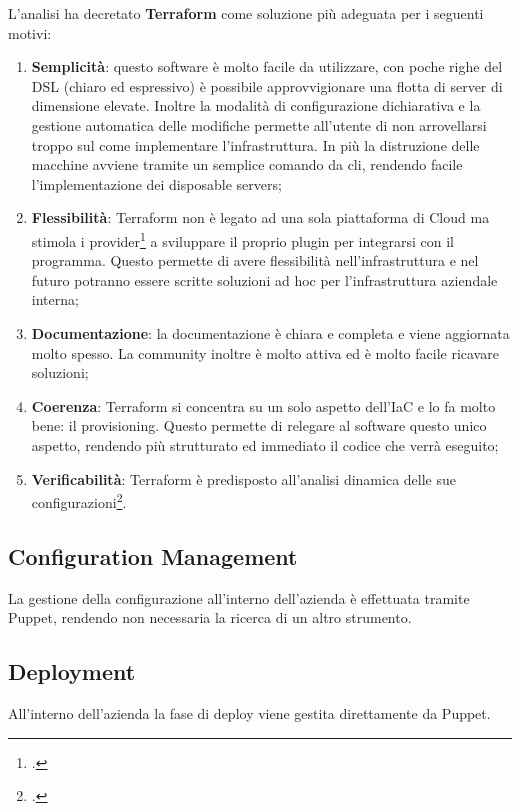 L'analisi ha decretato \textbf{Terraform} come soluzione più adeguata per i seguenti motivi:
\begin{enumerate}
	\item \textbf{Semplicità}: questo software è molto facile da utilizzare, con poche righe del DSL (chiaro ed espressivo) è possibile approvvigionare una flotta di server di dimensione elevate. Inoltre la modalità di configurazione dichiarativa e la gestione automatica delle modifiche permette all'utente di non arrovellarsi troppo sul come implementare l'infrastruttura. In più la distruzione delle macchine avviene tramite un semplice comando da \gls{cli}, rendendo facile l'implementazione dei disposable servers;
	\item \textbf{Flessibilità}: Terraform non è legato ad una sola piattaforma di Cloud ma stimola i provider\footcite{article:terraformextend} a sviluppare il proprio plugin per integrarsi con il programma. Questo permette di avere flessibilità nell'infrastruttura e nel futuro potranno essere scritte soluzioni ad hoc per l'infrastruttura aziendale interna;
	\item \textbf{Documentazione}: la documentazione è chiara e completa e viene aggiornata molto spesso. La community inoltre è molto attiva ed è molto facile ricavare soluzioni;
	\item \textbf{Coerenza}: Terraform si concentra su un solo aspetto dell'IaC e lo fa molto bene: il provisioning. Questo permette di relegare al software questo unico aspetto, rendendo più strutturato ed immediato il codice che verrà eseguito;
	\item \textbf{Verificabilità}: Terraform è predisposto all'analisi dinamica delle sue configurazioni\footcite{article:terraformtest}.
\end{enumerate}
\subsection{Configuration Management}
La gestione della configurazione all'interno dell'azienda è effettuata tramite Puppet, rendendo non necessaria la ricerca di un altro strumento.  
\subsection{Deployment}
All'interno dell'azienda la fase di deploy viene gestita direttamente da Puppet.

